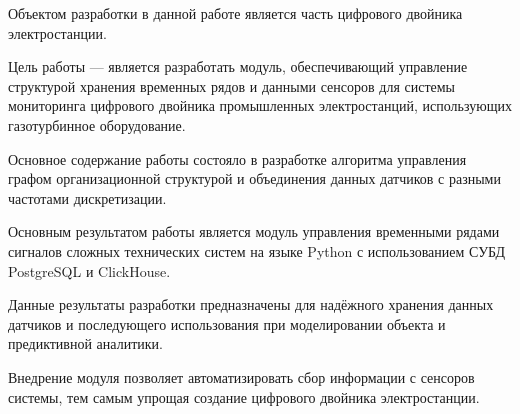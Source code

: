 \abstract %


Объектом разработки в данной работе является часть цифрового двойника электростанции.

Цель работы --- является разработать модуль, обеспечивающий управление структурой хранения временных рядов и данными сенсоров для системы мониторинга цифрового двойника промышленных электростанций, использующих газотурбинное оборудование.

Основное содержание работы состояло в разработке алгоритма управления графом организационной структурой и объединения данных датчиков с разными частотами дискретизации.

Основным результатом работы является модуль управления временными рядами сигналов сложных технических систем на языке Python с использованием СУБД PostgreSQL и ClickHouse.

Данные результаты разработки предназначены для надёжного хранения данных датчиков и последующего использования при моделировании объекта и предиктивной аналитики.

Внедрение модуля позволяет автоматизировать сбор информации с сенсоров системы, тем самым упрощая создание цифрового двойника электростанции.
